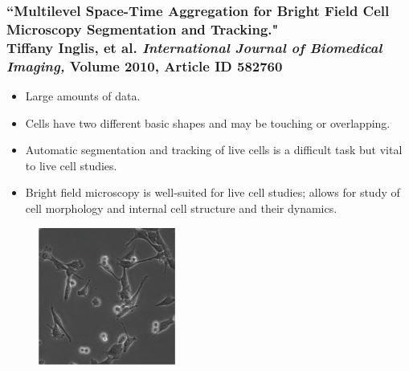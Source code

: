 \documentclass[8pt]{beamer}
\begin{document}
\begin{frame}
\frametitle{``Multilevel Space-Time Aggregation for Bright Field Cell Microscopy Segmentation and Tracking." \\ { \small Tiffany Inglis, et al. \textit{International Journal of Biomedical Imaging,} Volume 2010, Article ID 582760}
 }
\begin{itemize}
\item Large amounts of data.
\item Cells have two different basic shapes and may be touching or overlapping.
\item Automatic segmentation and tracking of live cells is a difficult task but vital to live cell studies.
\item Bright field microscopy is well-suited for live cell studies; allows for study of cell morphology and internal cell structure and their dynamics.
\end{itemize}

\begin{figure}
\centering
\includegraphics[width=0.4\textwidth,height=0.4\textwidth]{cells.png} \hspace{.45cm}
\end{figure}
\end{frame}
\end{document}
